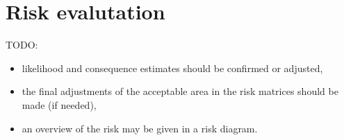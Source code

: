 \section{Risk evalutation}

TODO:
\begin{itemize}
    \item likelihood and consequence estimates should be
confirmed or adjusted,
    \item the final adjustments of the acceptable area in the risk
matrices should be made (if needed),
    \item an overview of the risk may be given in a risk diagram.
\end{itemize}